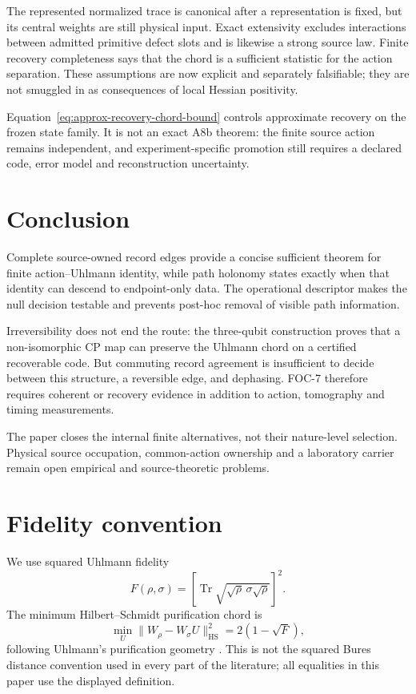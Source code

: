 \documentclass[11pt]{article}
\newcommand{\HS}{\mathrm{HS}}
\newcommand{\Tr}{\operatorname{Tr}}
\begin{document}
The represented normalized trace is canonical after a representation is
fixed, but its central weights are still physical input.  Exact extensivity
excludes interactions between admitted primitive defect slots and is likewise
a strong source law.  Finite recovery completeness says that the chord is a
sufficient statistic for the action separation.  These assumptions are now
explicit and separately falsifiable; they are not smuggled in as consequences
of local Hessian positivity.

Equation~\eqref{eq:approx-recovery-chord-bound} controls approximate recovery
on the frozen state family.  It is not an exact A8b theorem: the finite source
action remains independent, and experiment-specific promotion still requires
a declared code, error model and reconstruction uncertainty.

\section{Conclusion}

Complete source-owned record edges provide a concise sufficient theorem for
finite action--Uhlmann identity, while path holonomy states exactly when that
identity can descend to endpoint-only data.  The operational descriptor makes
the null decision testable and prevents post-hoc removal of visible path
information.

Irreversibility does not end the route: the three-qubit construction proves
that a non-isomorphic CP map can preserve the Uhlmann chord on a certified
recoverable code.  But commuting record agreement is insufficient to decide
between this structure, a reversible edge, and dephasing.  FOC-7 therefore
requires coherent or recovery evidence in addition to action, tomography and
timing measurements.

The paper closes the internal finite alternatives, not their nature-level
selection.  Physical source occupation, common-action ownership and a
laboratory carrier remain open empirical and source-theoretic problems.

\appendix
\section{Fidelity convention}

We use squared Uhlmann fidelity
\begin{equation}
 F(\rho,\sigma)=\left[\Tr\sqrt{\sqrt\rho\,\sigma\sqrt\rho}\right]^2.
\end{equation}
The minimum Hilbert--Schmidt purification chord is
\begin{equation}
 \min_U\lVert W_\rho-W_\sigma U\rVert_{\HS}^2
 =2(1-\sqrt F),
\end{equation}
following Uhlmann's purification geometry \cite{Uhlmann1976}.  This is not the
squared Bures distance convention used in every part of the literature; all
equalities in this paper use the displayed definition.



\end{document}
